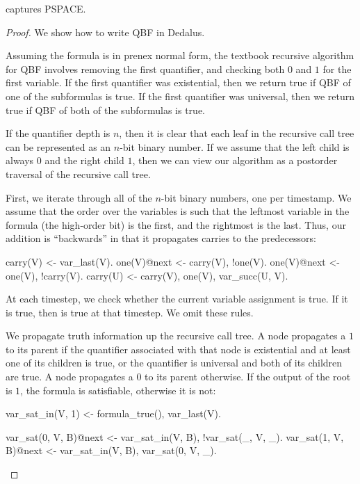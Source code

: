 \begin{lemma}
\label{lem:lang-pspace}
\lang captures PSPACE.
\end{lemma}
\begin{proof}
We show how to write QBF in Dedalus.

Assuming the formula is in prenex normal form, the textbook recursive algorithm for QBF involves removing the first quantifier, and checking both $0$ and $1$ for the first variable.  If the first quantifier was existential, then we return true if QBF of one of the subformulas is true.  If the first quantifier was universal, then we return true if QBF of both of the subformulas is true.

If the quantifier depth is $n$, then it is clear that each leaf in the recursive call tree can be represented as an $n$-bit binary number.  If we assume that the left child is always $0$ and the right child $1$, then we can view our algorithm as a postorder traversal of the recursive call tree.

First, we iterate through all of the $n$-bit binary numbers, one per timestamp.  We assume that the order over the variables is such that the leftmost variable in the formula (the high-order bit) is the first, and the rightmost is the last.  Thus, our addition is ``backwards'' in that it propagates carries to the predecessors:

\begin{Dedalus}
carry(V) <- var_last(V).
one(V)@next <- carry(V), !one(V).
one(V)@next <- one(V), !carry(V).
carry(U) <- carry(V), one(V), var_succ(U, V).
\end{Dedalus}

At each timestep, we check whether the current variable assignment is true.  If it is true, then  is true at that timestep.  We omit these rules.

We propagate truth information up the recursive call tree.  A node propagates a $1$ to its parent if the quantifier associated with that node is existential and at least one of its children is true, or the quantifier is universal and both of its children are true.  A node propagates a $0$ to its parent otherwise.  If the output of the root is $1$, the formula is satisfiable, otherwise it is not: 

\begin{Dedalus}
var_sat_in(V, 1) <- formula_true(), var_last(V).

var_sat(0, V, B)@next <- var_sat_in(V, B),
!var_sat(_, V, _).
var_sat(1, V, B)@next <- var_sat_in(V, B),
var_sat(0, V, _).


\end{Dedalus}
\end{proof}
